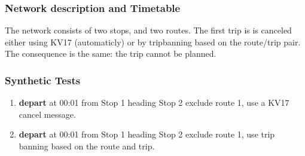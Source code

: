 \documentclass[a4paper,11pt]{article}
\begin{document}
\begin{enumerate}
\subsubsection*{Network description and Timetable}
The network consists of two stops, and two routes.
The first trip is is canceled either using KV17 (automaticly) or by tripbanning based on the route/trip pair.
The consequence is the same: the trip cannot be planned.

\begin{figure}[h]
\vspace{1em}
\raggedleft
\begin{minipage}{293pt}
\end{minipage}
\label{fig:delay_network}
\vspace{-2em}
\end{figure}

\subsubsection*{Synthetic Tests}
\begin{enumerate}
\item \textbf{depart} at 00:01 from Stop 1 heading Stop 2 exclude route 1, use a KV17 cancel message.
\item \textbf{depart} at 00:01 from Stop 1 heading Stop 2 exclude route 1, use trip banning based on the route and trip.
\end{enumerate}


\end{enumerate}
\end{document}
